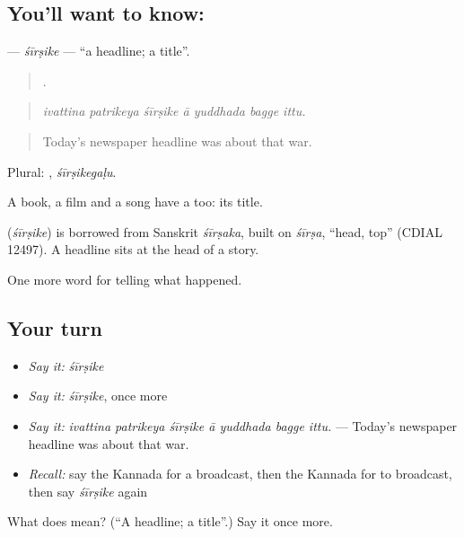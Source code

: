 \subsection*{You'll want to know: }
\textbf{} — \emph{śīrṣike} — \textquotedblleft{}a headline; a title\textquotedblright{}.

\begin{quote}
      .
\end{quote}

\begin{quote}
\emph{ivattina patrikeya śīrṣike ā yuddhada bagge ittu.}
\end{quote}

\begin{quote}
Today's newspaper headline was about that war.
\end{quote}

Plural: , \emph{śīrṣikegaḷu}.

A book, a film and a song have a  too: its title.

\begin{cousinweb}
\textbf{} (\emph{śīrṣike}) is borrowed from Sanskrit \emph{śīrṣaka}, built on \emph{śīrṣa}, \textquotedblleft{}head, top\textquotedblright{} (CDIAL 12497). A headline sits at the head of a story.
\end{cousinweb}

\begin{grammarlens}[title={What you've built}]
One more word for telling what happened.
\end{grammarlens}

\subsection*{Your turn}
\begin{itemize}
\raggedright
  \item \emph{Say it:} \emph{śīrṣike}
  \item \emph{Say it:} \emph{śīrṣike}, once more
  \item \emph{Say it:} \emph{ivattina patrikeya śīrṣike ā yuddhada bagge ittu.} — Today's newspaper headline was about that war.
  \item \emph{Recall:} say the Kannada for a broadcast, then the Kannada for to broadcast, then say \emph{śīrṣike} again
\end{itemize}

\begin{tcolorbox}[breakable,colback=teal!4,colframe=teal!35!black,title={Before you move on}]
What does  mean? (\textquotedblleft{}A headline; a title\textquotedblright{}.) Say it once more.
\end{tcolorbox}
